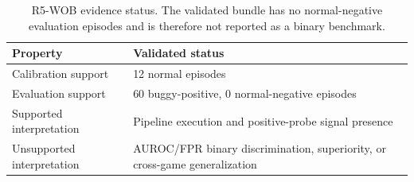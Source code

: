 \begin{table}[t]
\centering
\caption{R5-WOB evidence status. The validated bundle has no normal-negative evaluation episodes
and is therefore not reported as a binary benchmark.}
\label{tab:r5-wob-results}
\small
\begin{tabularx}{\textwidth}{@{}lX@{}}
\toprule
Property & Validated status \\
\midrule
Calibration support & 12 normal episodes \\
Evaluation support & 60 buggy-positive, 0 normal-negative episodes \\
Supported interpretation & Pipeline execution and positive-probe signal presence \\
Unsupported interpretation & AUROC/FPR binary discrimination, superiority, or cross-game generalization \\
\bottomrule
\end{tabularx}
\end{table}

